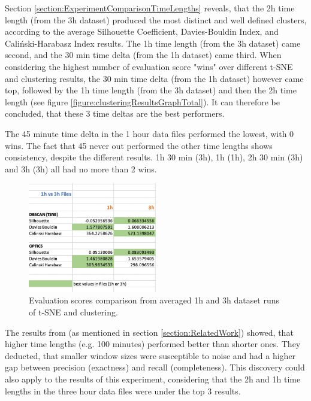 
Section \ref{section:ExperimentComparisonTimeLengths} reveals, that the 2h time length (from the 3h dataset) produced the most distinct and well defined clusters, according to the average Silhouette Coefficient, Davies-Bouldin Index, and Caliński-Harabasz Index results. The 1h time length (from the 3h dataset) came second, and the 30 min time delta (from the 1h dataset) came third. When considering the highest number of evaluation score "wins" over different t-SNE and clustering results, the 30 min time delta (from the 1h dataset) however came top, followed by the 1h time length (from the 3h dataset) and then the 2h time length (see figure \ref{figure:clusteringResultsGraphTotal}). It can therefore be concluded, that these 3 time deltas are the best performers.

The 45 minute time delta in the 1 hour data files performed the lowest, with 0 wins. The fact that 45 never out performed the other time lengths shows consistency, despite the different results. 1h 30 min (3h), 1h (1h), 2h 30 min (3h) and 3h (3h) all had no more than 2 wins. 


\begin{figure}
  \centering
  \includegraphics[width=0.5\textwidth]{./images/clusteringResults/clusteringResults7.png}
  \caption{Evaluation scores comparison from averaged 1h and 3h dataset runs of t-SNE and clustering.}
  \label{figure:clusteringResults7}
\end{figure}


The results from \textcite{AboutToEat2016Rahman} (as mentioned in section \ref{section:RelatedWork}) showed, that higher time lengths (e.g. 100 minutes) performed better than shorter ones. They deducted, that smaller window sizes were susceptible to noise and had a higher gap between precision (exactness) and recall (completeness). 
This discovery could also apply to the results of this experiment, considering that the 2h and 1h time lengths in the three hour data files were under the top 3 results.


